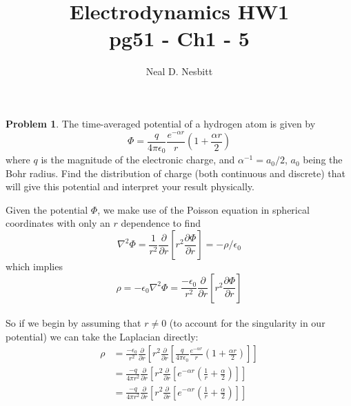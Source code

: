 \documentclass{article}
\title{Electrodynamics HW1\\
pg51 - Ch1 - 5}
\author{Neal D. Nesbitt}
\begin{document}
\maketitle

\theoremstyle{definition}
\newtheorem{problem}{Problem}

\begin{problem}
	The time-averaged potential of a hydrogen atom is given by
	\[ \Phi = \frac{q}{4\pi\epsilon_{0}} \frac{e^{-\alpha r}}{r} \left( 1 + \frac{\alpha r}{2} \right) \]
	where $q$ is the magnitude of the electronic charge, and $\alpha^{-1}=a_{0}/2$, $a_{0}$ being the Bohr radius. Find the distribution of charge (both continuous and discrete) that will give this potential and interpret your result physically.	
\end{problem}

Given the potential $\Phi$, we make use of the Poisson equation in spherical coordinates with only an $r$ dependence to find
\[ \nabla^{2}\Phi = \frac{1}{r^{2}}\frac{\partial}{\partial r} \left[ r^{2} \frac{\partial\Phi}{\partial r}\right] = -\rho / \epsilon_{0} \]
which implies
\[ \rho = -\epsilon_{0} \nabla^{2}\Phi = \frac{-\epsilon_{0}}{r^{2}}\frac{\partial}{\partial r} \left[ r^{2} \frac{\partial\Phi}{\partial r}\right] \]
\\
So if we begin by assuming that $r\ne 0$ (to account for the singularity in our potential) we can take the Laplacian directly:
\begin{align*}
	\rho &= \frac{-\epsilon_{0}}{r^{2}}\frac{\partial}{\partial r} \left[ r^{2} \frac{\partial}{\partial r} \left[ \frac{q}{4\pi\epsilon_{0}} \frac{e^{-\alpha r}}{r} \left( 1 + \frac{\alpha r}{2} \right) \right] \right]\\
		&= \frac{-q}{4\pi r^{2}} \frac{\partial}{\partial r} \left[ r^{2} \frac{\partial}{\partial r} \left[ e^{-\alpha r} \left( \frac{1}{r} + \frac{\alpha}{2} \right) \right] \right]\\
		&= \frac{-q}{4\pi r^{2}} \frac{\partial}{\partial r} \left[ r^{2} \frac{\partial}{\partial r} \left[ e^{-\alpha r} \left( \frac{1}{r} + \frac{\alpha}{2} \right) \right] \right]\\
\end{align*}
\end{document}
